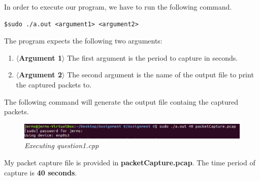 \documentclass[a4paper,11pt]{article}
\begin{document}
In order to execute our program, we have to run the following command.
\begin{mdframed}[backgroundcolor=light-gray, roundcorner=30pt,leftmargin=1, rightmargin=1, innerleftmargin=5, innertopmargin=-3,innerbottommargin=5, outerlinewidth=1, linecolor=light-gray]
\begin{lstlisting}
$sudo ./a.out <argument1> <argument2>
\end{lstlisting}
\end{mdframed}
The program expects the following two arguments:
\begin{enumerate}
\item \textbf{$\langle$Argument 1$\rangle$}
\newline The first argument is the period to capture in seconds. 
\item \textbf{$\langle$Argument 2$\rangle$}
\newline The second argument is the name of the output file to print the captured packets to.
\end{enumerate}
The following command will generate the output file containg the captured packets.
\begin{figure}[h!]
	\includegraphics[width = 16cm]{question1}
	\caption{\textit{Executing question1.cpp}}
\end{figure}
\newline
My packet capture file is provided in \textbf{packetCapture.pcap}. The time period of capture is \textbf{40 seconds}.
\end{document}
